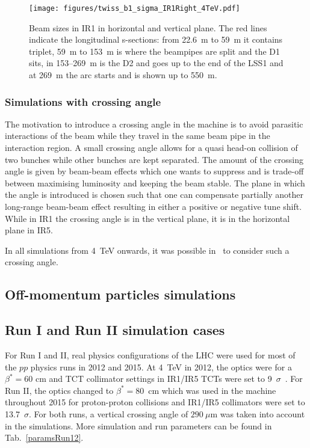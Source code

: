 \begin{figure}%
\begin{center}
  \texttt{[image: figures/twiss\_b1\_sigma\_IR1Right\_4TeV.pdf]}
\end{center}
\vspace{-0.6cm}
 \caption{Beam sizes in IR1 in horizontal and vertical plane. The red lines indicate the longitudinal s-sections: from 22.6~m to 59~m it contains triplet, 59~m to 153~m is where the beampipes are split and the D1 sits, in 153--269~m is the D2 and goes up to the end of the LSS1 and at 269~m the arc starts and is shown up to 550~m.
  \label{twissfileBS}}
\end{figure}

\subsubsection{Simulations with crossing angle}
The motivation to introduce a crossing angle in the machine is to avoid parasitic interactions of the beam while they travel in the same beam pipe in the interaction region. A small crossing angle allows for a quasi head-on collision of two bunches while other bunches are kept separated. The amount of the crossing angle is given by beam-beam effects which one wants to suppress and is trade-off between maximising luminosity and keeping the beam stable. The plane in which the angle is introduced is chosen such that one can compensate partially another long-range beam-beam effect resulting in either a positive or negative tune shift. While in IR1 the crossing angle is in the vertical plane, it is in the horizontal plane in IR5.

In all simulations from 4~TeV onwards, it was possible in \fluka~to consider such a crossing angle.

\subsection{Off-momentum particles simulations}



\subsection{Run I and Run II simulation cases}
For Run I and II, real physics configurations of the LHC were used for most of the $pp$ physics runs in 2012 and 2015. At 4~TeV in 2012, the optics were for a $\beta^* = 60$ cm and TCT collimator settings in IR1/IR5 TCTs were set to 9~$\sigma$~\cite{parametersRun1}. For Run II, the optics changed to $\beta^* = 80$~cm which was used in the machine throughout 2015 for proton-proton collisions and IR1/IR5 collimators were set to 13.7~$\sigma$. For both runs, a vertical crossing angle of $290~\mu$m was taken into account in the simulations. More simulation and run parameters can be found in Tab.~\ref{paramsRun12}. 


